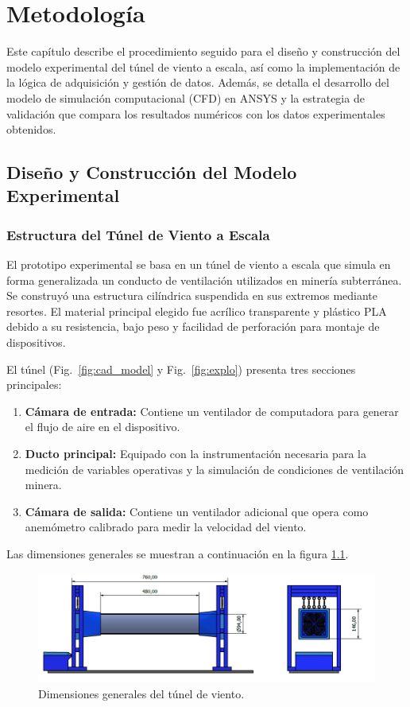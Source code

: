 \chapter{Metodología}

Este capítulo describe el procedimiento seguido para el diseño y construcción del modelo experimental del túnel de viento a escala, así como la implementación de la lógica de adquisición y gestión de datos. Además, se detalla el desarrollo del modelo de simulación computacional (CFD) en ANSYS y la estrategia de validación que compara los resultados numéricos con los datos experimentales obtenidos. 

\section{Diseño y Construcción del Modelo Experimental}
\subsection{Estructura del Túnel de Viento a Escala}
El prototipo experimental se basa en un túnel de viento a escala que simula en forma generalizada un conducto de ventilación utilizados en minería subterránea. Se construyó una estructura cilíndrica suspendida en sus extremos mediante resortes. El material principal elegido fue acrílico transparente y plástico PLA debido a su resistencia, bajo peso y facilidad de perforación para montaje de dispositivos.

El túnel (Fig.~\ref{fig:cad_model} y Fig.~\ref{fig:explo}) presenta tres secciones principales:
\begin{enumerate}
    \item \textbf{Cámara de entrada:} Contiene un ventilador de computadora para generar el flujo de aire en el dispositivo.
    \item \textbf{Ducto principal:} Equipado con la instrumentación necesaria para la medición de variables operativas y la simulación de condiciones de ventilación minera.
    \item \textbf{Cámara de salida:} Contiene un ventilador adicional que opera como anemómetro calibrado para medir la velocidad del viento.
\end{enumerate}

Las dimensiones generales se muestran a continuación en la figura \ref{fig:sim}.

\begin{figure}[!ht]
    \centering
    \includegraphics[width=0.8\linewidth]{images/dimen.png}
    \caption{Dimensiones generales del túnel de viento.}
    \label{fig:sim}
\end{figure}

